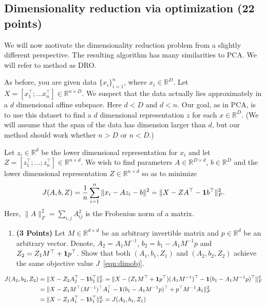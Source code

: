 \documentclass[a4paper]{article}
\newcounter{thm}
\newcommand*{\one}{{\bf 1}}
\theoremstyle{definition}
\newcommand{\RR}{\mathbb{R}}
\newenvironment{soln}{
    \leavevmode\color{blue}\ignorespaces
}{}
\begin{document}
\subsection{Dimensionality reduction via optimization (22 points)}

We will now motivate the dimensionality reduction problem from a slightly different
perspective. The resulting algorithm has many similarities to PCA.
We will refer to method as DRO.

As before, you are given data $\{x_i\}_{i=1}^n$, where $x_i \in \RR^D$. Let $X=[x_1^\top; \dots
x_n^\top] \in \RR^{n\times D}$. We suspect that the data
actually lies approximately in  a $d$ dimensional affine subspace.
Here $d<D$ and $d<n$.
Our goal, as in PCA, is to use this dataset to find a $d$ dimensional representation $z$ for each $x\in\RR^D$.
(We will assume that the span of the data has dimension larger than
$d$, but our method should work whether $n>D$ or $n<D$.)


Let $z_i\in \RR^d$ be the lower dimensional representation for $x_i$ and
let $Z = [z_1^\top; \dots; z_n^\top] \in \RR^{n\times d}$.
We wish to find parameters $A \in \RR^{D\times d}$, $b\in\RR^D$ and the lower
dimensional representation $Z\in \RR^{n\times d}$ so as to minimize 
\begin{equation}
J(A,b,Z) = \frac{1}{n} \sum_{i=1}^n \|x_i - Az_i - b\|^2 = \| X - ZA^\top - \one b^\top\|_F^2.
\label{eqn:dimobj}
\end{equation}
Here, $\|A\|^2_F = \sum_{i,j} A_{ij}^2$ is the Frobenius norm of a matrix.


\begin{enumerate}
\item \textbf{(3 Points)}
Let $M\in\RR^{d\times d}$ be an arbitrary invertible matrix and $p\in\RR^{d}$ be an arbitrary vector.
Denote, $A_2 = A_1M^{-1}$, $b_2 = b_1- A_1M^{-1}p$ and $Z_2 = Z_1 M^\top +
\one p^\top$.
Show that both
$(A_1, b_1, Z_1)$ and $(A_2, b_2, Z_2)$ achieve the same objective value $J$~\eqref{eqn:dimobj}.
\end{enumerate}

\begin{soln}
\begin{align*}
J(A_2,b_2,Z_2) &= \| X - Z_2A_2^\top - \one b_2^\top\|_F^2 = \| X - (Z_1 M^\top + \one p^\top)(A_1M^{-1})^\top - \one (b_1- A_1M^{-1}p)^\top\|_F^2\\
&= \| X - Z_1M^\top (M^{-1})^\top A_1^\top - \one (b_1- A_1M^{-1}p)^\top +p^\top M^{-1}A_1\|_F^2 \\
&= \| X - Z_1A_1^\top - \one b_1^\top\|_F^2 = J(A_1,b_1,Z_1)
\end{align*}
\end{soln}
\end{document}

